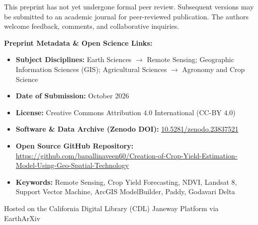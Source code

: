 \documentclass[11pt,a4paper]{article}
\begin{document}
\begin{titlepage}
\begin{center}
{\begin{minipage}{0.94\textwidth}
This preprint has not yet undergone formal peer review. Subsequent versions may be submitted to an academic journal for peer-reviewed publication. The authors welcome feedback, comments, and collaborative inquiries.
\vspace{0.25cm}
\end{minipage}
}
\end{center}

\vspace{0.5cm}

\noindent \textbf{\textsf{Preprint Metadata \& Open Science Links:}}
\begin{itemize}\setlength\itemsep{0.25em}
    \item \textbf{Subject Disciplines:} Earth Sciences $\rightarrow$ Remote Sensing; Geographic Information Sciences (GIS); Agricultural Sciences $\rightarrow$ Agronomy and Crop Science
    \item \textbf{Date of Submission:} October 2026
    \item \textbf{License:} Creative Commons Attribution 4.0 International (CC-BY 4.0)
    \item \textbf{Software \& Data Archive (Zenodo DOI):} \href{https://doi.org/10.5281/zenodo.23837521}{10.5281/zenodo.23837521}
    \item \textbf{Open Source GitHub Repository:} \url{https://github.com/bapallinaveen60/Creation-of-Crop-Yield-Estimation-Model-Using-Geo-Spatial-Technology}
    \item \textbf{Keywords:} Remote Sensing, Crop Yield Forecasting, NDVI, Landsat 8, Support Vector Machine, ArcGIS ModelBuilder, Paddy, Godavari Delta
\end{itemize}

\vfill
\begin{center}
    \small \textsf{Hosted on the California Digital Library (CDL) Janeway Platform via EarthArXiv}
\end{center}
\end{titlepage}

\clearpage
\setcounter{page}{1}

\maketitle
\end{document}
